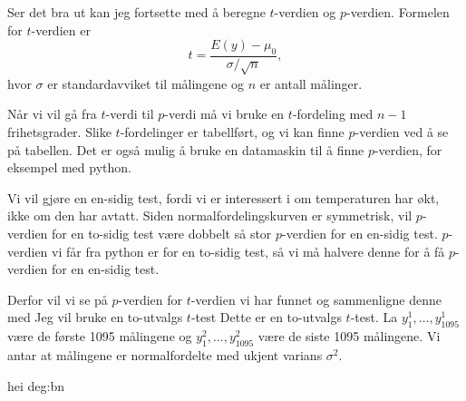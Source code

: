 Ser det bra ut kan jeg fortsette med å beregne $t$-verdien og $p$-verdien.
Formelen for $t$-verdien er
$$
t = \frac{E(y) - \mu_0}{\sigma/\sqrt{n}},
$$
hvor $\sigma$ er standardavviket til målingene og $n$ er antall målinger.

Når vi vil gå fra $t$-verdi til $p$-verdi må vi bruke en $t$-fordeling med $n-1$ frihetsgrader.
Slike $t$-fordelinger er tabellført, og vi kan finne $p$-verdien ved å se på tabellen. Det er også
mulig å bruke en datamaskin til å finne $p$-verdien, for eksempel med python.

Vi vil gjøre en en-sidig test, fordi vi er interessert i om temperaturen har økt, ikke om den har
avtatt.
Siden normalfordelingskurven er symmetrisk, vil $p$-verdien for en to-sidig test være dobbelt så stor
$p$-verdien for en en-sidig test.
$p$-verdien vi får fra python er for en to-sidig test, så vi må halvere denne for å få $p$-verdien
for en en-sidig test.


Derfor vil vi se på $p$-verdien for $t$-verdien vi har funnet og sammenligne denne med
Jeg vil bruke en to-utvalgs $t$-test
Dette er en to-utvalgs $t$-test. La $y^1_1, \dots, y^1_{1095}$ være
de første 1095 målingene og $y^2_1, \dots, y^2_{1095}$ være de siste 1095
målingene. Vi antar at målingene er normalfordelte med ukjent varians $\sigma^2$.

hei
deg:bn
